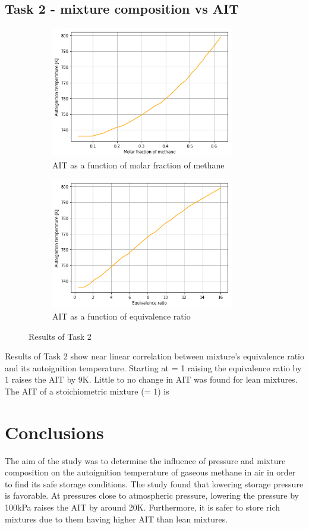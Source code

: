 \documentclass[a4paper]{article}[11pt]
\begin{document}
\newpage
\subsection{Task 2 - mixture composition vs AIT}
\begin{figure}[h]
\begin{subfigure}{.5\textwidth}
\centering
\includegraphics[width=8cm]{2.png}
\caption{AIT as a function of molar fraction of methane}
\end{subfigure}
\begin{subfigure}{.5\textwidth}
\centering
\includegraphics[width=8cm]{3.png}
\caption{AIT as a function of equivalence ratio}
\end{subfigure}
\caption{Results of Task 2}
\end{figure}

Results of Task 2 show near linear correlation between mixture's equivalence ratio and its autoignition temperature. Starting at \textphi = 1 raising the equivalence ratio by 1 raises the AIT by 9K. Little to no change in AIT was found for lean mixtures. The AIT of a stoichiometric mixture (\textphi = 1) is 

    \section{Conclusions}
    The aim of the study was to determine the influence of pressure and mixture composition on the autoignition temperature of gaseous methane in air in order to find its safe storage conditions. The study found that lowering storage pressure is favorable. At pressures close to atmospheric pressure, lowering the pressure by 100kPa raises the AIT by around 20K. Furthermore, it is safer to store rich mixtures due to them having higher AIT than lean mixtures.
    
\end{document}
